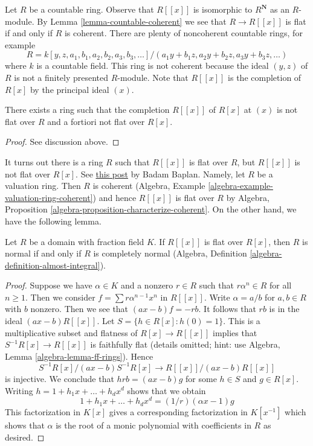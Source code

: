 \noindent
Let $R$ be a countable ring. Observe that $R[[x]]$ is isomorphic to
$R^\mathbf{N}$ as an $R$-module. By Lemma \ref{lemma-countable-coherent}
we see that $R \to R[[x]]$ is flat if and only if $R$ is coherent.
There are plenty of noncoherent countable rings, for example
$$
R = k[y, z, a_1, b_1, a_2, b_2, a_3, b_3, \ldots]/
(a_1 y + b_1 z, a_2 y + b_2 z, a_3 y + b_3 z, \ldots)
$$
where $k$ is a countable field. This ring is not coherent because
the ideal $(y, z)$ of $R$ is not a finitely presented $R$-module.
Note that $R[[x]]$ is the completion of $R[x]$ by the principal
ideal $(x)$.

\begin{lemma}
\label{lemma-completion-polynomial-ring-not-flat}
There exists a ring such that the completion $R[[x]]$ of $R[x]$
at $(x)$ is not flat over $R$ and a fortiori not flat over $R[x]$.
\end{lemma}

\begin{proof}
See discussion above.
\end{proof}

\noindent
It turns out there is a ring $R$ such that $R[[x]]$ is flat
over $R$, but $R[[x]]$ is not flat over $R[x]$. See
\href{https://math.stackexchange.com/users/164860/badam-baplan}{this post}
by Badam Baplan. Namely, let
$R$ be a valuation ring. Then $R$ is coherent (Algebra, Example
\ref{algebra-example-valuation-ring-coherent}) and hence
$R[[x]]$ is flat over $R$ by 
Algebra, Proposition \ref{algebra-proposition-characterize-coherent}.
On the other hand, we have the following lemma.

\begin{lemma}
\label{lemma-almost-integral-when-powerseries-flat}
Let $R$ be a domain with fraction field $K$.
If $R[[x]]$ is flat over $R[x]$, then $R$ is normal if and only
if $R$ is completely normal
(Algebra, Definition \ref{algebra-definition-almost-integral}).
\end{lemma}

\begin{proof}
Suppose we have $\alpha \in K$ and a nonzero $r \in R$ such that
$r \alpha^n \in R$ for all $n \geq 1$. Then we consider
$f = \sum r \alpha^{n - 1} x^n$ in $R[[x]]$. Write $\alpha = a/b$
for $a, b \in R$ with $b$ nonzero. Then we see that $(a x - b)f = -rb$.
It follows that $rb$ is in the ideal $(ax - b)R[[x]]$.
Let $S = \{h \in R[x] : h(0) = 1\}$. This is a multiplicative subset
and flatness of $R[x] \to R[[x]]$ implies that $S^{-1}R[x] \to R[[x]]$
is faithfully flat (details omitted; hint: use Algebra, Lemma
\ref{algebra-lemma-ff-rings}). Hence
$$
S^{-1}R[x]/(ax - b)S^{-1}R[x] \to R[[x]]/(ax - b)R[[x]]
$$
is injective. We conclude that
$h rb = (ax - b) g$ for some $h \in S$ and $g \in R[x]$.
Writing $h = 1 + h_1 x + \ldots + h_d x^d$ shows that we obtain
$$
1 + h_1 x + \ldots + h_d x^d = (1/r)(\alpha x - 1)g
$$
This factorization in $K[x]$ gives a corresponding factorization
in $K[x^{-1}]$ which shows that $\alpha$ is the root of a monic
polynomial with coefficients in $R$ as desired.
\end{proof}

